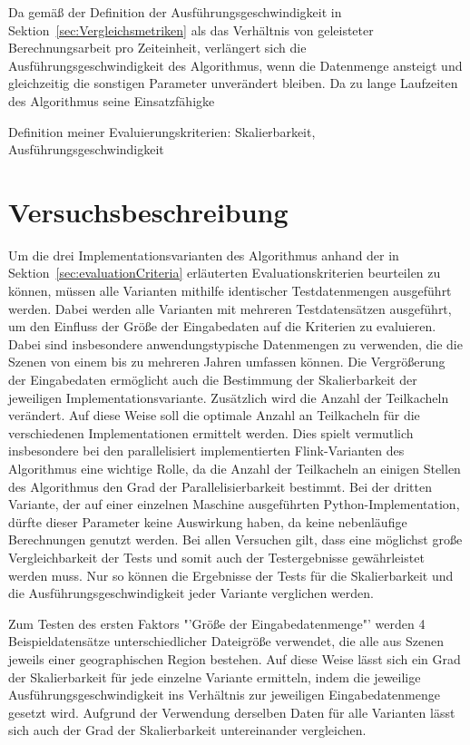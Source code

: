 Da gemäß der Definition der Ausführungsgeschwindigkeit in Sektion~\ref{sec:Vergleichsmetriken} als das Verhältnis von geleisteter Berechnungsarbeit pro Zeiteinheit, verlängert sich die Ausführungsgeschwindigkeit des Algorithmus, wenn die Datenmenge ansteigt und gleichzeitig die sonstigen Parameter unverändert bleiben. Da zu lange Laufzeiten des Algorithmus seine Einsatzfähigke

Definition meiner Evaluierungskriterien:
Skalierbarkeit, Ausführungsgeschwindigkeit

\section{Versuchsbeschreibung}
Um die drei Implementationsvarianten des Algorithmus anhand der in Sektion~\ref{sec:evaluationCriteria} erläuterten Evaluationskriterien beurteilen zu können, müssen alle Varianten mithilfe identischer Testdatenmengen ausgeführt werden. Dabei werden alle Varianten mit mehreren Testdatensätzen ausgeführt, um den Einfluss der Größe der Eingabedaten auf die Kriterien zu evaluieren. Dabei sind insbesondere anwendungstypische Datenmengen zu verwenden, die die Szenen von einem bis zu mehreren Jahren umfassen können. Die Vergrößerung der Eingabedaten ermöglicht auch die Bestimmung der Skalierbarkeit der jeweiligen Implementationsvariante.
Zusätzlich wird die Anzahl der Teilkacheln verändert. Auf diese Weise soll die optimale Anzahl an Teilkacheln für die verschiedenen Implementationen ermittelt werden. Dies spielt vermutlich insbesondere bei den parallelisiert implementierten Flink-Varianten des Algorithmus eine wichtige Rolle, da die Anzahl der Teilkacheln an einigen Stellen des Algorithmus den Grad der Parallelisierbarkeit bestimmt. Bei der dritten Variante, der auf einer einzelnen Maschine ausgeführten Python-Implementation, dürfte dieser Parameter keine Auswirkung haben, da keine nebenläufige Berechnungen genutzt werden. Bei allen Versuchen gilt, dass eine möglichst große Vergleichbarkeit der Tests und somit auch der Testergebnisse gewährleistet werden muss. Nur so können die Ergebnisse der Tests für die Skalierbarkeit und die Ausführungsgeschwindigkeit jeder Variante verglichen werden.

Zum Testen des ersten Faktors "'Größe der Eingabedatenmenge"' werden 4 Beispieldatensätze unterschiedlicher Dateigröße verwendet, die alle aus Szenen jeweils einer geographischen Region bestehen. Auf diese Weise lässt sich ein Grad der Skalierbarkeit für jede einzelne Variante ermitteln, indem die jeweilige Ausführungsgeschwindigkeit ins Verhältnis zur jeweiligen Eingabedatenmenge gesetzt wird. Aufgrund der Verwendung derselben Daten für alle Varianten lässt sich auch der Grad der Skalierbarkeit untereinander vergleichen. 

